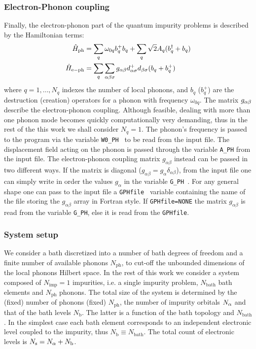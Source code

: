 \documentclass[edipack2.tex]{subfiles}
\begin{document}
\subsubsection{Electron-Phonon coupling}
Finally, the electron-phonon part of the quantum impurity problems is
described by the Hamiltonian terms: 
\begin{equation}\label{Hph}
  \begin{split}
    \hat{H}_\mathrm{ph}&=\sum_q \omega_{0q} b_q^+b_q + \sum_q \sqrt{2}A_{q}(b^\dagger_q + b_q)  \\
    \hat{H}_\mathrm{e-ph} &= \sum_q\sum_{\alpha\beta\sigma} g_{\alpha\beta} d^+_{\alpha\sigma}d_{\beta\sigma}(b_q+b_q^+)
\end{split}
\end{equation}
where $q=1,\dots,N_q$ indexes the number of local phonons, and $b_q$
($b_q^+$) are the destruction (creation) operators for a phonon with
frequency $\omega_{0q}$.
The matrix  $g_{\alpha\beta}$ describe the electron-phonon coupling. 
Although feasible, dealing with more than one phonon mode becomes
quickly computationally very demanding, thus in the rest of the this
work we shall consider $N_q=1$.
The phonon's frequency is passed to the \NAME program via the variable { \tt W0\_PH } to be read from the input file. The displacement field acting on the phonon is passed through the variable {\tt A\_PH} from the input file. The electron-phonon coupling matrix $g_{\alpha \beta}$ instead can be passed in two different ways. If the matrix is diagonal ($g_{\alpha \beta} = g_\alpha \delta_{\alpha \beta}$), from the input file one can simply write in order the values $g_\alpha$ in the variable {\tt G\_PH }. For any general shape one can pass to the input file a {\tt GPHfile } variable containing the name of the file storing the $g_{\alpha \beta}$ array in Fortran style.
If {\tt GPHfile=NONE} the matrix $g_{\alpha \beta}$ is read from the variable {\tt G\_PH}, else it is read from the {\tt GPHfile}.

\subsubsection{System setup}
We consider a bath discretized into a  number
of bath degrees of freedom and a finite number of available phonons $N_\mathrm{ph}$,
to cut-off the unbounded dimensions of the local phonons Hilbert
space.
In the rest of this work we consider a system composed of $N_\mathrm{imp}=1$
impurities, i.e. a single impurity problem, $N_\mathrm{bath}$ bath elements
and $N_\mathrm{ph}$ phonons.
The total size of the system is determined by the (fixed)
number of phonons (fixed) $N_\mathrm{ph}$, the number of impurity orbitals 
$N_\alpha$ and that of the bath levels  $N_\mathrm{b}$. The latter is a
function of  the bath topology and $N_\mathrm{bath}$.
In the simplest case each bath
element corresponds to an independent electronic level coupled to the
impurity, thus $N_\mathrm{b}\equiv N_\mathrm{bath}$.
The total count of electronic levels is  $N_\mathrm{s}=N_\alpha +
N_\mathrm{b}$. 
\end{document}
